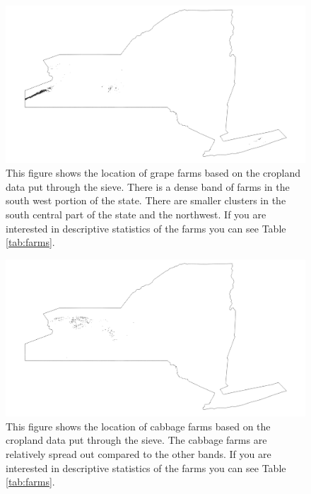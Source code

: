 \documentclass{report}
\begin{document}
\begin{figure}
\centering
\begin{framed}
\includegraphics[scale=.50]{farms_69}
\caption{This figure shows the location of grape farms based on the cropland data put through the sieve. There is a dense band of farms in the south west portion of the state. There are smaller clusters in the south central part of the state and the northwest. If you are interested in descriptive statistics of the farms you can see Table \ref{tab:farms}.}
\label{fig:farms_69}
\end{framed}
\end{figure}

\begin{figure}
\centering
\begin{framed}
\includegraphics[scale=.50]{farms_243}
\caption{This figure shows the location of cabbage farms based on the cropland data put through the sieve. The cabbage farms are relatively spread out compared to the other bands. If you are interested in descriptive statistics of the farms you can see Table \ref{tab:farms}.}
\label{fig:farms_243}
\end{framed}
\end{figure}
\end{document}
